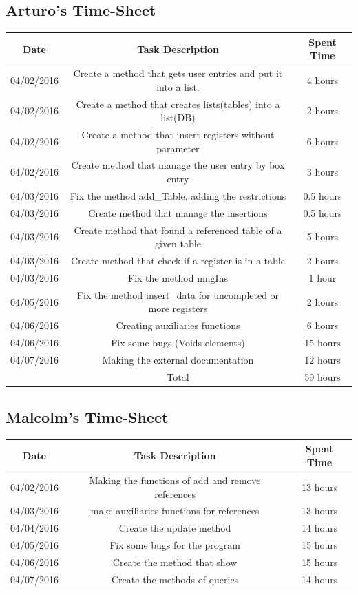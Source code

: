 \documentclass[12pt]{article}
\begin{document}
\begin{itemize}
\subsection{Arturo's Time-Sheet}
\begin{center}
\begin{tabular}{ |c|c|c| } 
 \hline
 Date & Task Description & Spent Time \\ 
 \hline\hline
 04/02/2016 & Create a method that gets user entries and put it into a list. & 4 hours\\
 04/02/2016 & Create a method that creates lists(tables) into a list(DB) & 2 hours\\
 04/02/2016 & Create a method that insert registers without parameter & 6 hours\\
 04/02/2016 & Create method that manage the user entry by box entry  & 3 hours \\
 04/03/2016 & Fix the method add\_Table, adding the restrictions & 0.5 hours \\
 04/03/2016 & Create method that manage the insertions& 0.5 hours\\
 04/03/2016 & Create method that found a referenced table of a given table & 5 hours \\
 04/03/2016 & Create method that check if a register is in a table & 2 hours \\
 04/03/2016 & Fix the method mngIns & 1 hour \\
 04/05/2016 & Fix the method insert\_data for uncompleted or more registers & 2 hours \\
 04/06/2016 & Creating auxiliaries functions & 6 hours\\
 04/06/2016 & Fix some bugs (Voids elements) & 15 hours\\
 04/07/2016 & Making the external documentation & 12 hours\\
 

 \hline
 & Total & 59 hours\\ 
 \hline
\end{tabular}
\end{center}
\subsection{Malcolm's Time-Sheet} 
\begin{center}
\begin{tabular}{ |c|c|c|} 
 \hline
 Date &  Task Description &  Spent Time \\ 
 \hline\hline 
 04/02/2016 & Making the functions of add and remove references & 13 hours\\
 04/03/2016 & make auxiliaries functions for references & 13 hours \\
 04/04/2016 & Create the update method & 14 hours\\
 04/05/2016 & Fix some bugs for the program & 15 hours\\
 04/06/2016 & Create the method that show & 15 hours\\
 04/07/2016 & Create the methods of queries & 14 hours\\
 


\end{tabular}
\end{center}
\end{itemize}
\end{document}
